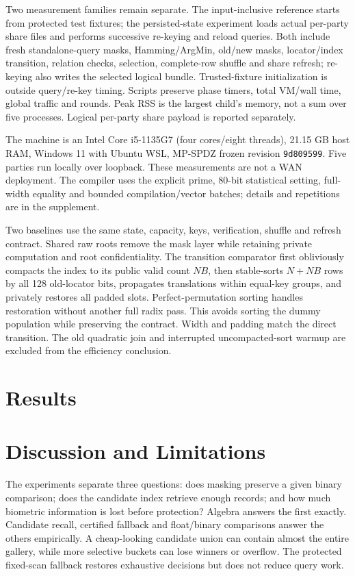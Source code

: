 \documentclass[journal]{IEEEtran}
\begin{document}
Two measurement families remain separate. The input-inclusive reference starts from protected test fixtures; the persisted-state experiment loads actual per-party share files and performs successive re-keying and reload queries. Both include fresh standalone-query masks, Hamming/ArgMin, old/new masks, locator/index transition, relation checks, selection, complete-row shuffle and share refresh; re-keying also writes the selected logical bundle. Trusted-fixture initialization is outside query/re-key timing. Scripts preserve phase timers, total VM/wall time, global traffic and rounds. Peak RSS is the largest child's memory, not a sum over five processes. Logical per-party share payload is reported separately.

The machine is an Intel Core i5-1135G7 (four cores/eight threads), 21.15 GB host RAM, Windows 11 with Ubuntu WSL, MP-SPDZ frozen revision \texttt{9d809599}. Five parties run locally over loopback. These measurements are not a WAN deployment. The compiler uses the explicit prime, 80-bit statistical setting, full-width equality and bounded compilation/vector batches; details and repetitions are in the supplement.

Two baselines use the same state, capacity, keys, verification, shuffle and refresh contract. Shared raw roots remove the mask layer while retaining private computation and root confidentiality. The transition comparator first obliviously compacts the index to its public valid count $NB$, then stable-sorts $N+NB$ rows by all 128 old-locator bits, propagates translations within equal-key groups, and privately restores all padded slots. Perfect-permutation sorting handles restoration without another full radix pass. This avoids sorting the dummy population while preserving the contract. Width and padding match the direct transition. The old quadratic join and interrupted uncompacted-sort warmup are excluded from the efficiency conclusion.

\section{Results}


\section{Discussion and Limitations}
The experiments separate three questions: does masking preserve a given binary comparison; does the candidate index retrieve enough records; and how much biometric information is lost before protection? Algebra answers the first exactly. Candidate recall, certified fallback and float/binary comparisons answer the others empirically. A cheap-looking candidate union can contain almost the entire gallery, while more selective buckets can lose winners or overflow. The protected fixed-scan fallback restores exhaustive decisions but does not reduce query work.
\end{document}
